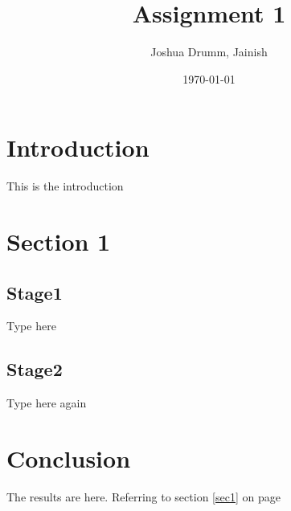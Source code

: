 \documentclass[a4paper,12pt]{article}
\begin{document}
\title{Assignment 1}
\author{Joshua Drumm, Jainish}
\date{\today}
\maketitle

\tableofcontents
\newpage
{}

\section{Introduction}
This is the introduction

\section{Section 1}

\subsection{Stage1}
Type here

\subsection{Stage2}
Type here again

\section{Conclusion}
The results are here. Referring to section \ref{sec1} on page \pageref{sec1}

\newpage
\nocite{*} %


\end{document}
